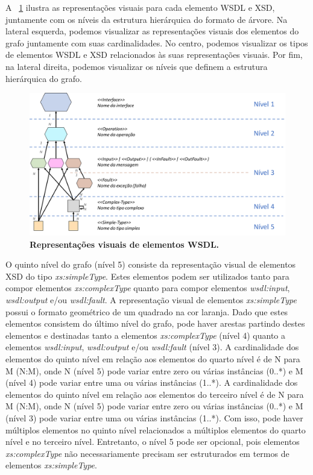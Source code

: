 A \figurename~\ref{fig:grafo-wsdl-niveis} ilustra as representações visuais para cada elemento WSDL e XSD, juntamente com os níveis da estrutura hierárquica do formato de árvore. Na lateral esquerda, podemos visualizar as representações visuais dos elementos do grafo juntamente com suas cardinalidades. No centro, podemos visualizar os tipos de elementos WSDL e XSD relacionados às suas representações visuais. Por fim, na lateral direita, podemos visualizar os níveis que definem a estrutura hierárquica do grafo.

\begin{figure}[h]
    \includegraphics[scale=0.3]{3-notacao-visual-sawsdl/imagens/grafo-wsdl-niveis.PNG}
    \centering
    \caption[Representações visuais de elementos WSDL]{\textbf{Representações visuais de elementos WSDL.}}
    \label{fig:grafo-wsdl-niveis}
\end{figure}

O quinto nível do grafo (nível 5) consiste da representação visual de elementos XSD do tipo \textit{xs:simpleType}. Estes elementos podem ser utilizados tanto para compor elementos \textit{xs:complexType} quanto para compor elementos \textit{wsdl:input}, \textit{wsdl:output} e/ou \textit{wsdl:fault}. A representação visual de elementos \textit{xs:simpleType} possui o formato geométrico de um quadrado na cor laranja. Dado que estes elementos consistem do último nível do grafo, pode haver arestas partindo destes elementos e destinadas tanto a elementos \textit{xs:complexType} (nível 4) quanto a elementos \textit{wsdl:input}, \textit{wsdl:output} e/ou \textit{wsdl:fault} (nível 3). A cardinalidade dos elementos do quinto nível em relação aos elementos do quarto nível é de N para M (N:M), onde N (nível 5) pode variar entre zero ou várias instâncias (0..*) e M (nível 4) pode variar entre uma ou várias instâncias (1..*). A cardinalidade dos elementos do quinto nível em relação aos elementos do terceiro nível é de N para M (N:M), onde N (nível 5) pode variar entre zero ou várias instâncias (0..*) e M (nível 3) pode variar entre uma ou várias instâncias (1..*). Com isso, pode haver múltiplos elementos no quinto nível relacionados a múltiplos elementos do quarto nível e no terceiro nível. Entretanto, o nível 5 pode ser opcional, pois elementos \textit{xs:complexType} não necessariamente precisam ser estruturados em termos de elementos \textit{xs:simpleType}.

